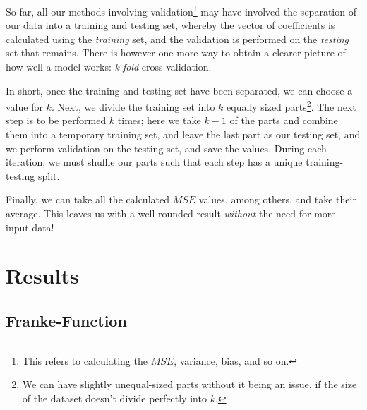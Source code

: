 \documentclass[a4paper,10pt,english]{article}
\begin{document}
So far, all our methods involving validation\footnote{This refers to calculating the $MSE$, variance, bias, and so on.} may have involved the separation of our data into a training and testing set, whereby the vector of coefficients is calculated using the \textit{training} set, and the validation is performed on the \textit{testing} set that remains.	There is however one more way to obtain a clearer picture of how well a model works: \textit{k-fold} cross validation.	

In short, once the training and testing set have been separated, we can choose a value for $k$.  Next, we divide the training set into $k$ equally sized parts\footnote{We can have slightly unequal-sized parts without it being an issue, if the size of the dataset doesn't divide perfectly into $k$.}.  The next step is to be performed $k$ times; here we take $k-1$ of the parts and combine them into a temporary training set, and leave the last part as our testing set, and we perform validation on the testing set, and save the values.  During each iteration, we must shuffle our parts such that each step has a unique training-testing split.

Finally, we can take all the calculated $MSE$ values, among others, and take their average.  This leaves us with a well-rounded result \textit{without} the need for more input data!



\section{Results}
\label{sec:results}

\subsection{Franke-Function}

\end{document}
